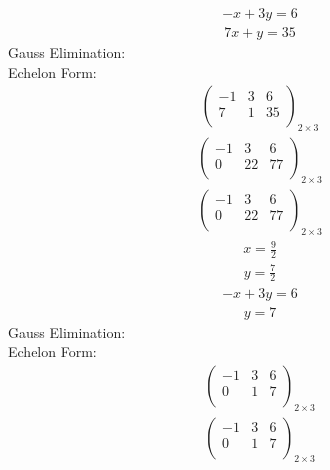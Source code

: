 \documentclass{article}
\begin{document}
\begin{align*}
-x + 3y=6\end{align*}
\begin{align*}
7x + y=35\end{align*}
Gauss Elimination:\\
Echelon Form:\\
\begin{align*}
\left(
\begin{array}{cc|c}
-1 & 3 & 6\\
7 & 1 & 35\\
\end{array}
\right)_{2\times 3}
\end{align*}
\begin{align*}
\left(
\begin{array}{cc|c}
-1 & 3 & 6\\
0 & 22 & 77\\
\end{array}
\right)_{2\times 3}
\end{align*}
\begin{align*}
\left(
\begin{array}{cc|c}
-1 & 3 & 6\\
0 & 22 & 77\\
\end{array}
\right)_{2\times 3}
\end{align*}
\begin{align*}
x=\frac{9}{2}\end{align*}
\begin{align*}
y=\frac{7}{2}\end{align*}
\begin{align*}
-x + 3y=6\end{align*}
\begin{align*}
y=7\end{align*}
Gauss Elimination:\\
Echelon Form:\\
\begin{align*}
\left(
\begin{array}{cc|c}
-1 & 3 & 6\\
0 & 1 & 7\\
\end{array}
\right)_{2\times 3}
\end{align*}
\begin{align*}
\left(
\begin{array}{cc|c}
-1 & 3 & 6\\
0 & 1 & 7\\
\end{array}
\right)_{2\times 3}
\end{align*}
\end{document}
